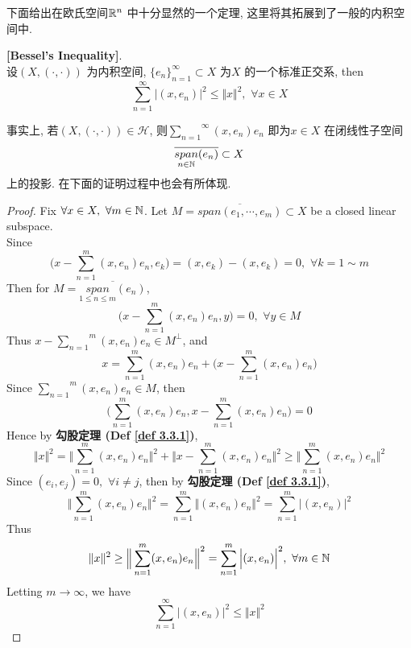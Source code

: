 	下面给出在欧氏空间$\mathbb{R}^n$ 中十分显然的一个定理, 这里将其拓展到了一般的内积空间中. 
	
	\begin{thm}\label{thm 3.4.1}
		\textbf{[Bessel's Inequality]}. \\
		设$(X , (\cdot , \cdot))$ 为内积空间, $\{ e_n \}_{n = 1}^{\infty} \subset X$ 为$X$ 的一个标准正交系, then
		\[ \sum_{n = 1}^{\infty} \Big| (x , e_n) \Big|^2 \leq \Vert x \Vert^2 , \,\, \forall x \in X \]
		
		\vspace{2em}
		
		\begin{rmk}
			事实上, 若$(X , (\cdot , \cdot)) \in \mathcal{H}$, 则$\overset{\infty}{\underset{n = 1}{\sum}} (x , e_n) e_n$ 即为$x \in X$ 在闭线性子空间
			\[ \overline{\underset{n \in \mathbb{N}}{span}(e_n)} \subset X \]
			上的投影. 在下面的证明过程中也会有所体现. 
		\end{rmk}
	
		\newpage
		
		\begin{proof}
			Fix $\forall x \in X , \,\, \forall m \in \mathbb{N}$. Let $M = \overline{span(e_1 , \cdots , e_m)} \subset X$ be a closed linear subspace. \\
			Since
			\[ \Big( x - \sum_{n = 1}^{m} (x , e_n) e_n , e_k \Big) 
			= (x , e_k) - (x , e_k) 
			= 0 , \,\, \forall k = 1 \sim m \]
			Then for $M = \overline{\underset{1 \leq n \leq m}{span} (e_n)}$, 
			\[ \Big( x - \sum_{n = 1}^{m} (x , e_n) e_n , y \Big) = 0 , \,\, \forall y \in M  \]
			Thus $x - \overset{m}{\underset{n = 1}{\sum}} (x , e_n) e_n \in M^{\perp}$, and
			\[ x = \sum_{n = 1}^{m} (x , e_n) e_n + \Big( x - \sum_{n = 1}^{m} (x , e_n) e_n \Big) \]
			Since $\overset{m}{\underset{n = 1}{\sum}} (x , e_n) e_n \in M$, then
			\[ \Big( \sum_{n = 1}^{m} (x , e_n) e_n , x - \sum_{n = 1}^{m} (x , e_n) e_n \Big) = 0 \]
			Hence by \textbf{勾股定理 (Def \ref{def 3.3.1})}, 
			\[
				\Vert x \Vert^2 
				= \Big\Vert \sum_{n = 1}^{m} (x , e_n) e_n \Big\Vert^2 + \Big\Vert x - \sum_{n = 1}^{m} (x , e_n) e_n \Big\Vert^2 
				\geq \Big\Vert \sum_{n = 1}^{m} (x , e_n) e_n \Big\Vert^2
			\]
			Since $(e_i , e_j) = 0 , \,\, \forall i \neq j$, then by \textbf{勾股定理 (Def \ref{def 3.3.1})}, 
			\[ \Big\Vert \sum_{n = 1}^{m} (x , e_n) e_n \Big\Vert^2 
			= \sum_{n = 1}^{m} \Big\Vert (x , e_n) e_n \Big\Vert^2 
			= \sum_{n = 1}^{m} \Big| (x , e_n) \Big|^2 \]
			Thus
			\[ \Vert x \Vert^2 
			\geq \Big\Vert \sum_{n = 1}^{m} (x , e_n) e_n \Big\Vert^2 
			= \sum_{n = 1}^{m} \Big| (x , e_n) \Big|^2 , \,\, \forall m \in \mathbb{N} \]
			Letting $m \to \infty$, we have
			\[ \sum_{n = 1}^{\infty} \Big| (x , e_n) \Big|^2 \leq \Vert x \Vert^2 \]
		\end{proof}
	\end{thm}

